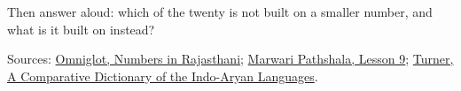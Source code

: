Then answer aloud: which of the twenty is not built on a smaller number, and what is it built on instead?

\begin{tcolorbox}[breakable,colback=teal!4,colframe=teal!35!black,title={Before you move on}]
Sources: \href{https://www.omniglot.com/language/numbers/rajasthani.htm}{Omniglot, Numbers in Rajasthani}; \href{https://www.marwaripathshala.com/marwari-lesson-9-english}{Marwari Pathshala, Lesson 9}; \href{https://dsal.uchicago.edu/dictionaries/soas/}{Turner, A Comparative Dictionary of the Indo-Aryan Languages}.
\end{tcolorbox}
